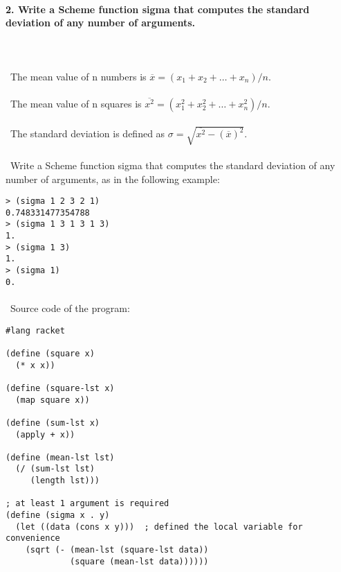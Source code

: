 \documentclass{article}
\begin{document}
\paragraph{}\

	\paragraph{2. Write a Scheme function sigma that computes the standard deviation of any number of arguments.}\
	
\paragraph{}\
		The mean value of n numbers is \(\overline{x} = (x_1 + x_2 + \ldots + x_n) / n\).
\paragraph{}\
		The mean value of n squares is \(\overline{x^2} = (x_1^2 + x_2^2 + \ldots + x_n^2) / n\).
\paragraph{}\
		The standard deviation is defined as \(\sigma = \sqrt{ \overline{x^2} - (\overline{x})^2 } \).
\paragraph{}\
		Write a Scheme function sigma that computes the standard deviation of any number of arguments, as in the following example:		
		
\begin{verbatim} 
> (sigma 1 2 3 2 1)
0.748331477354788
> (sigma 1 3 1 3 1 3)
1.
> (sigma 1 3)
1.
> (sigma 1)
0.
\end{verbatim}

\paragraph{}\	
Source code of the program:
	
\begin{verbatim} 
#lang racket

(define (square x)
  (* x x))

(define (square-lst x)
  (map square x))

(define (sum-lst x)
  (apply + x))

(define (mean-lst lst)
  (/ (sum-lst lst)
     (length lst)))

; at least 1 argument is required
(define (sigma x . y)
  (let ((data (cons x y)))	; defined the local variable for convenience
    (sqrt (- (mean-lst (square-lst data))
             (square (mean-lst data))))))
\end{verbatim}	
\end{document}
